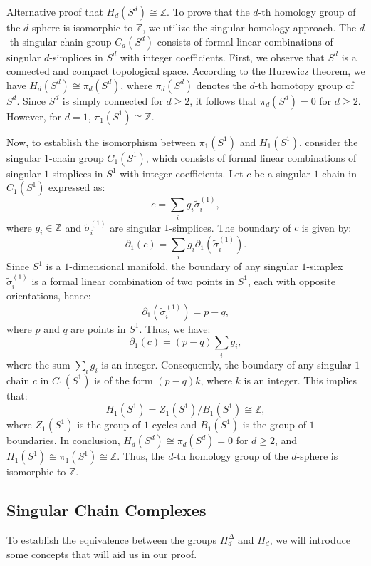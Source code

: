 \begin{example}
	Alternative proof that $H_{d}(S^{d}) \cong \mathbb{Z}$. To prove that the $d$-th
	homology group of the $d$-sphere is isomorphic to $\mathbb{Z}$, we utilize the
	singular homology approach. The $d$-th singular chain group $C_{d}(S^{d})$
	consists of formal linear combinations of singular $d$-simplices in $S^{d}$
	with integer coefficients. First, we observe that $S^{d}$ is a connected and
	compact topological space. According to the Hurewicz theorem, we have
	$H_{d}(S^{d}) \cong \pi_{d}(S^{d})$, where $\pi_{d}(S^{d})$ denotes the $d$-th
	homotopy group of $S^{d}$. Since $S^{d}$ is simply connected for $d \geq 2$, it
	follows that $\pi_{d}(S^{d}) = 0$ for $d \geq 2$. However, for $d = 1$,
	$\pi_{1}(S^{1}) \cong \mathbb{Z}$.

	Now, to establish the isomorphism between $\pi_{1}(S^{1})$ and $H_{1}(S^{1})$,
	consider the singular $1$-chain group $C_{1}(S^{1})$, which consists of formal
	linear combinations of singular $1$-simplices in $S^{1}$ with integer coefficients.
	Let $c$ be a singular $1$-chain in $C_{1}(S^{1})$ expressed as:
	\[
		c = \sum_{i} g_{i} \tilde{\sigma}^{(1)}_{i},
	\]
	where $g_{i} \in \mathbb{Z}$ and $\tilde{\sigma}^{(1)}_{i}$ are singular $1$-simplices.
	The boundary of $c$ is given by:
	\[
		\partial_{1}(c) = \sum_{i} g_{i} \partial_{1}(\tilde{\sigma}^{(1)}_{i}).
	\]
	Since $S^{1}$ is a $1$-dimensional manifold, the boundary of any singular $1$-simplex
	$\tilde{\sigma}^{(1)}_{i}$ is a formal linear combination of two points in
	$S^{1}$, each with opposite orientations, hence:
	\[
		\partial_{1}(\tilde{\sigma}^{(1)}_{i}) = p - q,
	\]
	where $p$ and $q$ are points in $S^{1}$. Thus, we have:
	\[
		\partial_{1}(c) = (p - q) \sum_{i} g_{i},
	\]
	where the sum $\sum_{i} g_{i}$ is an integer. Consequently, the boundary of
	any singular $1$-chain $c$ in $C_{1}(S^{1})$ is of the form $(p - q)k$, where $k$
	is an integer. This implies that:
	\[
		H_{1}(S^{1}) = Z_{1}(S^{1}) / B_{1}(S^{1}) \cong \mathbb{Z},
	\]
	where $Z_{1}(S^{1})$ is the group of $1$-cycles and $B_{1}(S^{1})$ is the group
	of $1$-boundaries. In conclusion, $H_{d}(S^{d}) \cong \pi_{d}(S^{d}) = 0$ for $d
	\geq 2$, and $H_{1}(S^{1}) \cong \pi_{1}(S^{1}) \cong \mathbb{Z}$. Thus, the
	$d$-th homology group of the $d$-sphere is isomorphic to $\mathbb{Z}$.
\end{example}

\subsection{Singular Chain Complexes}
\label{Singular Chain Complexes} To establish the equivalence between the groups
$H_{d}^{\Delta}$ and $H_{d}$, we will introduce some concepts that will aid us in
our proof.

